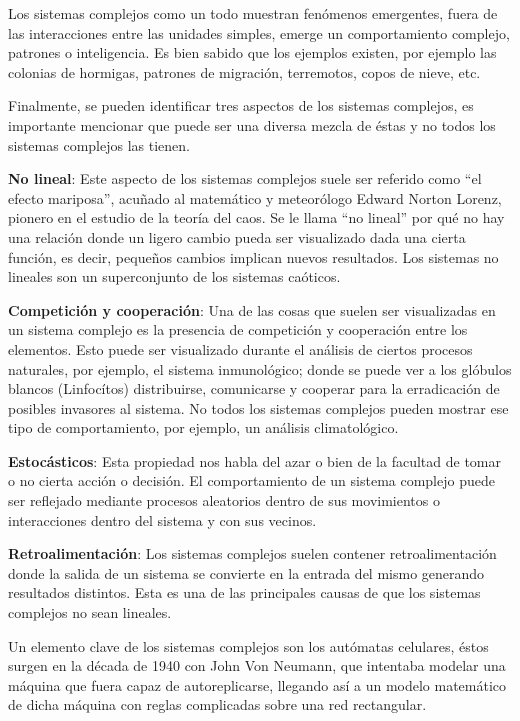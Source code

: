       Los sistemas complejos como un todo muestran fenómenos emergentes, fuera de las interacciones entre las unidades simples, emerge un comportamiento complejo, patrones o inteligencia. Es bien sabido que los ejemplos existen, por ejemplo las colonias de hormigas, patrones de migración, terremotos, copos de nieve, etc.

      Finalmente, se pueden identificar tres aspectos de los sistemas complejos, es importante mencionar que puede ser una diversa mezcla de éstas y no todos los sistemas complejos las tienen.

      \textbf{No lineal}: Este aspecto de los sistemas complejos suele ser referido como ``el efecto mariposa'', acuñado al matemático y meteorólogo Edward Norton Lorenz, pionero en el estudio de la teoría del caos. Se le llama ``no lineal'' por qué no hay una relación donde un ligero cambio pueda ser visualizado dada una cierta función, es decir, pequeños cambios implican nuevos resultados. Los sistemas no lineales son un superconjunto de los sistemas caóticos.

      \textbf{Competición y cooperación}: Una de las cosas que suelen ser visualizadas en un sistema complejo es la presencia de competición y cooperación entre los elementos. Esto puede ser visualizado durante el análisis de ciertos procesos naturales, por ejemplo, el sistema inmunológico; donde se puede ver a los glóbulos blancos (Linfocítos) distribuirse, comunicarse y cooperar para la erradicación de posibles invasores al sistema. No todos los sistemas complejos pueden mostrar ese tipo de comportamiento, por ejemplo, un análisis climatológico.

      \textbf{Estocásticos}: Esta propiedad nos habla del azar o bien de la facultad de tomar o no cierta acción o decisión. El comportamiento de un sistema complejo puede ser reflejado mediante procesos aleatorios dentro de sus movimientos o interacciones dentro del sistema y con sus vecinos.

      \textbf{Retroalimentación}: Los sistemas complejos suelen contener retroalimentación donde la salida de un sistema se convierte en la entrada del mismo generando resultados distintos. Esta es una de las principales causas de que los sistemas complejos no sean lineales.\cite{3} \cite{5}

      Un elemento clave de los sistemas complejos son los autómatas celulares, éstos surgen en la década de 1940 con John Von Neumann, que intentaba modelar una máquina que fuera capaz de autoreplicarse, llegando así a un modelo matemático de dicha máquina con reglas complicadas sobre una red rectangular.

